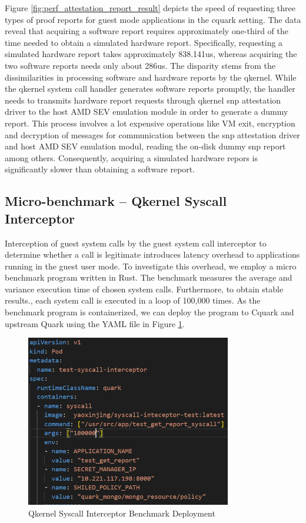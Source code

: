 Figure \ref*{fig:perf_attestation_report_result} depicts the speed of requesting three types of proof reports for guest mode applications in the cquark setting. The data reveal that acquiring a software report requires approximately one-third of the time needed to obtain a simulated hardware report. 
Specifically, requesting a simulated hardware report takes approximately 838.141us, whereas acquiring the two software reports needs only about 286us. The disparity stems from the dissimilarities in processing software and hardware reports by the qkernel. While the qkernel 
system call handler generates software reports promptly, the handler needs to transmits hardware report requests through qkernel snp attestation driver to the host AMD SEV emulation module in order to generate a dummy report. This process involves a lot expensive operations like VM exit, 
encryption and decryption of messages for communication between the snp attestation driver and host AMD SEV emulation modul, reading the on-disk dummy snp report among others. Consequently, acquiring a simulated hardware repors is significantly slower than obtaining a software report.

\subsection{Micro-benchmark – Qkernel Syscall Interceptor}

Interception of guest system calls by the guest system call interceptor to determine whether a call is legitimate introduces latency overhead to applications running in the guest user mode.  To investigate this overhead, we employ a micro benchmark program written in Rust.  The benchmark measures the average and variance execution time of chosen system calls. Furthermore, to obtain stable results., each system call is executed in a loop of 100,000 times. As the benchmark program is containerized, we can deploy the program to Cquark and upstream Quark using the YAML file in Figure \ref*{fig:syscall_interceptor_yaml}.
\begin{figure}[H]
    \centering
    \includegraphics[width=0.8\textwidth]{images/perf_system_call_interceptor_yaml.PNG}
    \caption[Qkernel Syscall Interceptor Benchmark Deployment]{Qkernel Syscall Interceptor Benchmark Deployment}
    \label{fig:syscall_interceptor_yaml}
\end{figure}


